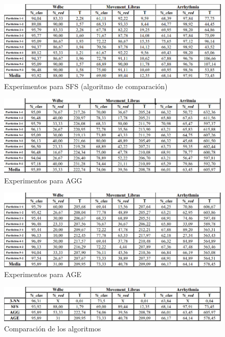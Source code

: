 \begin{figure} [H]
	\centering
	\includegraphics[width=1.0\linewidth]{SFS}
	\caption{Experimentos para SFS (algoritmo de comparación)}
	\label{fig:SFS}
\end{figure}

\begin{figure} [H]
\centering
\includegraphics[width=1.0\linewidth]{AGG}
\caption{Experimentos para AGG}
\label{fig:AGG}
\end{figure}

\begin{figure} [H]
\centering
\includegraphics[width=1.0\linewidth]{AGE}
\caption{Experimentos para AGE}
\label{fig:AGE}
\end{figure}

\begin{figure} [H]
\centering
\includegraphics[width=1.0\linewidth]{todos}
\caption{Comparación de los algoritmos}
\label{fig:todos}
\end{figure}

